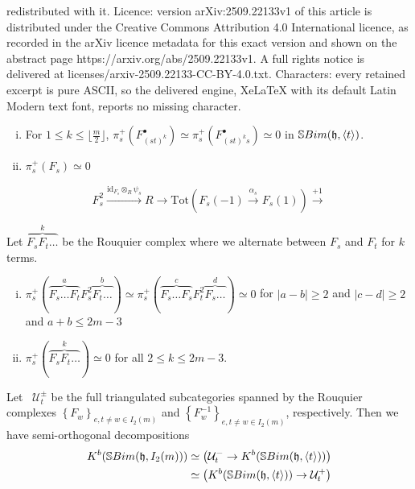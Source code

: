 \documentclass[10pt,a4paper]{amsart}
\newcommand{\Uc}{\mathcal{U}}
\newcommand{\abrac}[1]{\left\langle#1\right\rangle}
\newcommand{\hf}{\mathfrak{h}}
\newcommand{\id}{\mathrm{id}}
\newcommand{\paren}[1]{\left( #1 \right)}
\newcommand{\sbim}{\mathbb{S}\textnormal{Bim}}
\newcommand{\set}[1]{\left \{ #1 \right \}}
\begin{document}
redistributed with it. Licence: version arXiv:2509.22133v1 of this article is distributed under the Creative Commons Attribution 4.0 International licence, as recorded in the arXiv licence metadata for this exact version and shown on the abstract page https://arxiv.org/abs/2509.22133v1. A full rights notice is delivered at licenses/arxiv-2509.22133-CC-BY-4.0.txt. Characters: every retained excerpt is pure ASCII, so the delivered engine, XeLaTeX with its default Latin Modern text font, reports no missing character.
\begin{corollary}
\label{pis0}
\begin{enumerate}[(i)]
    \item  For $1\le k\le \lfloor\frac{m}{2}\rfloor$,  $\pi^+_s\paren{F^\bullet_{(st)^k}}\simeq \pi^+_s\paren{F^\bullet_{(st)^ks}}\simeq 0$ in $\sbim(\hf, \abrac{t} )$.
    \item $\pi^+_s\paren{F_s}\simeq 0$
\end{enumerate}
\end{corollary}

\begin{equation}
\label{spliteq}
    F_s^2\xrightarrow{\id_{F_s}\otimes_R \psi_s} R\to \mathrm{Tot}\paren{F_s(-1)\xrightarrow{\alpha_s} \boxed{F_s(1)}} \xrightarrow{+1}
\end{equation}

\begin{prop}
\label{preprop}
Let $\overbrace{F_sF_t\ldots}^{k }$ be the Rouquier complex where we alternate between $F_s$ and $F_t$ for $k$ terms.
\begin{enumerate}[(i)]
    \item $\pi_s^+(\overbrace{F_s\ldots F_t}^{a }F_s^2\overbrace{F_t\ldots}^{b })\simeq \pi_s^+(\overbrace{F_s\ldots F_s}^{c }F_t^2\overbrace{F_s\ldots}^{d })\simeq 0$ for $|a-b|\ge 2$ and $|c- d|\ge 2$ and $a+b\le 2m-3$
    \item $\pi_s^+(\overbrace{F_sF_t\ldots}^{k })\simeq 0$ for all $2\le k \le 2m-3$.
\end{enumerate}
\end{prop}

\begin{corollary}
\label{semicor}
    Let \, $\Uc_t^{\pm}$ be the full triangulated subcategories spanned by the Rouquier complexes $\set{F_w}_{e,t\neq w\in I_2(m)}$ and $\set{F_w^{-1}}_{e,t\neq w\in I_2(m)}$, respectively. Then we have semi-orthogonal decompositions
    \begin{align*}
       K^b( \sbim(\hf, I_2(m) )) & \simeq \paren{ \Uc_t^{-} \to K^b( \sbim(\hf, \abrac{t} ))  } \\
       & \simeq \paren{  K^b( \sbim(\hf, \abrac{t} ))\to \Uc_t^{+}   }
    \end{align*}
\end{corollary}
\end{document}
